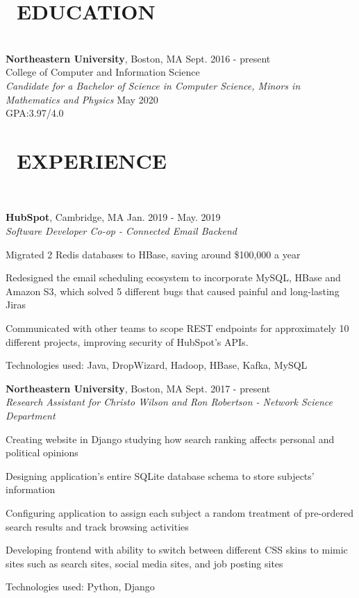 \documentclass[11pt]{res}
\newcommand{\sectionunderline}{\vspace{-3mm}\hrulefill\\}
\newcommand{\listingtab}{\tabto{3.5cm}}
\newcommand{\newsect}[1]{\section{\Large \bf #1}}
\newcommand{\email}[1]{\faEnvelope\hspace{1mm} \href{mailto:#1}{#1}}
\newcommand{\phone}[1]{\faMobilePhone\hspace{1mm} #1}
\newcommand{\github}[1]{\faGithubAlt\hspace{1mm} \href{https://github.com/#1}{#1}}
\newcommand{\linkedin}[1]{\faLinkedinSquare\hspace{1mm} \href{https://linkedin.com/in/#1}{#1}}
\begin{document}
\address{
  \large\phone{(802) 503-5089}\:
  \large{$\bullet$}
  \large\email{derekpham67@gmail.com}\:
  \large{$\bullet$}
  \large\github{derekpham}\:
  \large{$\bullet$}
  \large\linkedin{derek-pham97}\\
  \normalsize Available: June - August 2019
}

\begin{resume}
  \newsect{\faGraduationCap\ EDUCATION}{
    \sectionunderline{
      {\bf Northeastern University}, Boston, MA \hfill Sept. 2016 - present\\
      College of Computer and Information Science}\\
                     {\it Candidate for a Bachelor of Science in Computer Science, Minors in Mathematics and Physics} \hfill May 2020
                     \vspace{2mm}\\
                     GPA:\listingtab 3.97/4.0
  }

  \newsect{\faUsers\ EXPERIENCE}{
    \sectionunderline{
      {\bf HubSpot}, Cambridge, MA \hfill Jan. 2019 - May. 2019\\
      {\it Software Developer Co-op - Connected Email Backend}
      \begin{itemize}
        {\item Migrated 2 Redis databases to HBase, saving around \$100,000 a year}
        {\item Redesigned the email scheduling ecosystem to incorporate  MySQL, HBase and Amazon S3, which solved 5 different bugs that caused painful and long-lasting Jiras}
        {\item Communicated with other teams to scope REST endpoints for approximately 10 different projects, improving security of HubSpot's APIs.}
        {\item Technologies used: Java, DropWizard, Hadoop, HBase, Kafka, MySQL}
      \end{itemize}

      {\bf Northeastern University}, Boston, MA \hfill Sept. 2017 - present\\
      {\it Research Assistant for Christo Wilson and Ron Robertson - Network Science Department}
      \begin{itemize}
        {\item Creating website in Django studying how search ranking affects personal and political opinions}
        {\item Designing application's entire SQLite database schema to store subjects' information}
        {\item Configuring application to assign each subject a random treatment of pre-ordered search results and track browsing activities}
        {\item Developing frontend with ability to switch between different CSS skins to mimic sites such as search sites, social media sites, and job posting sites}
        {\item Technologies used: Python, Django}
      \end{itemize}

}}
\end{resume}
\end{document}
